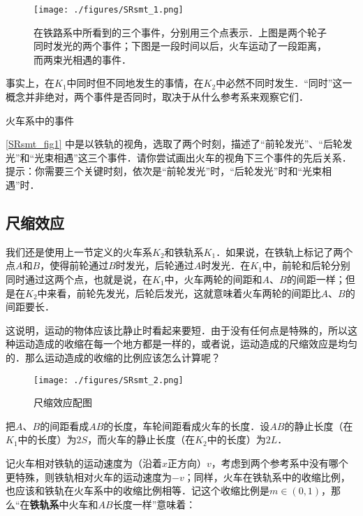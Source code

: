\begin{figure}[ht]
\centering
\texttt{[image: ./figures/SRsmt\_1.png]}
\caption{在铁路系中所看到的三个事件，分别用三个点表示．上图是两个轮子同时发光的两个事件；下图是一段时间以后，火车运动了一段距离，而两束光相遇的事件．} \label{SRsmt_fig1}
\end{figure}

事实上，在$K_1$中同时但不同地发生的事情，在$K_2$中必然不同时发生．“同时”这一概念并非绝对，两个事件是否同时，取决于从什么参考系来观察它们．

\begin{exercise}{火车系中的事件}

\autoref{SRsmt_fig1} 中是以铁轨的视角，选取了两个时刻，描述了“前轮发光”、“后轮发光”和“光束相遇”这三个事件．请你尝试画出火车的视角下三个事件的先后关系．提示：你需要三个关键时刻，依次是“前轮发光”时，“后轮发光”时和“光束相遇”时．

\end{exercise}

\subsection{尺缩效应}

我们还是使用上一节定义的火车系$K_2$和铁轨系$K_1$．如果说，在铁轨上标记了两个点$A$和$B$，使得前轮通过$B$时发光，后轮通过$A$时发光．在$K_1$中，前轮和后轮分别同时通过这两个点，也就是说，在$K_1$中，火车两轮的间距和$A$、$B$的间距一样；但是在$K_2$中来看，前轮先发光，后轮后发光，这就意味着火车两轮的间距比$A$、$B$的间距要长．

这说明，运动的物体应该比静止时看起来要短．由于没有任何点是特殊的，所以这种运动造成的收缩在每一个地方都是一样的，或者说，运动造成的尺缩效应是均匀的．那么运动造成的收缩的比例应该怎么计算呢？

\begin{figure}[ht]
\centering
\texttt{[image: ./figures/SRsmt\_2.png]}
\caption{尺缩效应配图} \label{SRsmt_fig2}
\end{figure}

把$A$、$B$的间距看成$AB$的长度，车轮间距看成火车的长度．设$AB$的静止长度（在$K_1$中的长度）为$2S$，而火车的静止长度（在$K_2$中的长度）为$2L$．

记火车相对铁轨的运动速度为（沿着$x$正方向）$v$，考虑到两个参考系中没有哪个更特殊，则铁轨相对火车的运动速度为$-v$；同样，火车在铁轨系中的收缩比例，也应该和铁轨在火车系中的收缩比例相等．记这个收缩比例是$m\in(0,1)$，那么“在\textbf{铁轨系}中火车和$AB$长度一样”意味着：

